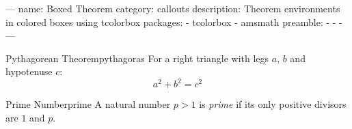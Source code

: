 ---
name: Boxed Theorem
category: callouts
description: Theorem environments in colored boxes using tcolorbox
packages:
  - tcolorbox
  - amsmath
preamble:
  - 
  - 
  - 
---
\begin{mytheorem}{Pythagorean Theorem}{pythagoras}
  For a right triangle with legs $a$, $b$ and hypotenuse $c$:
  \[ a^2 + b^2 = c^2 \]
\end{mytheorem}

\begin{mydef}{Prime Number}{prime}
  A natural number $p > 1$ is \emph{prime} if its only positive divisors are $1$ and $p$.
\end{mydef}
